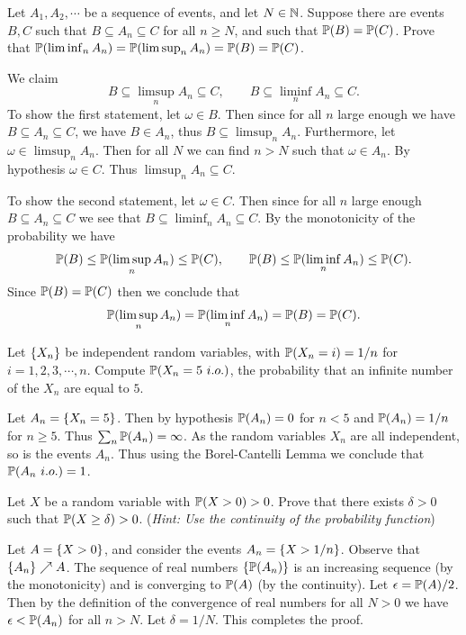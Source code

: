 \begin{problem}
	Let $ A_1,A_2,\cdots $ be a sequence of events, and let $ N \in \mathbb{N} $. Suppose there are events $ B,C $ such that $ B\subseteq A_n \subseteq C $ for all $ n\geq N $, and such that $ \mathbb{P}(B) = \mathbb{P}(C) $. Prove that $ \mathbb{P}(\liminf_n A_n) = \mathbb{P}(\limsup_n A_n) = \mathbb{P}(B) = \mathbb{P}(C) $.
\end{problem}
\begin{solution}
	We claim 
	\[ B \subseteq \limsup_n A_n \subseteq C, \qquad B \subseteq \liminf_n A_n \subseteq C. \]
	To show the first statement, let $ \omega \in B $. Then since for all $ n $ large enough we have $ B \subseteq A_n \subseteq C $, we have $ B \in A_n $, thus $ B \subseteq \limsup_n A_n $. Furthermore, let $ \omega \in \limsup_n A_n $. Then for all $ N $ we can find $ n>N $ such that $ \omega\in A_n $. By hypothesis $ \omega\in C $. Thus $ \limsup_n A_n \subseteq C $.
	
	\noindent To show the second statement, let $ \omega \in C $. Then since for all $ n $ large enough $ B \subseteq A_n \subseteq C $ we see that $ B\subseteq \liminf_n A_n \subseteq C $. By the monotonicity of the probability we have
	\[ \mathbb{P}(B) \leq \mathbb{P}(\limsup_n A_n) \leq \mathbb{P}(C) ,\qquad \mathbb{P}(B)\leq \mathbb{P}(\liminf_n A_n)\leq \mathbb{P}(C).\]
	Since $ \mathbb{P}(B) = \mathbb{P}(C) $ then we conclude that 
	\[ \mathbb{P}(\limsup_n A_n) = \mathbb{P}(\liminf_n A_n) = \mathbb{P}(B) = \mathbb{P}(C). \]
\end{solution}


\begin{problem}
	Let $ \{X_n\} $ be independent random variables, with $ \mathbb{P}(X_n = i) = 1/n $ for $ i=1,2,3,\cdots, n $. Compute $ \mathbb{P}(X_n = 5\ i.o.) $, the probability that an infinite number of the $ X_n $ are equal to $ 5 $.
\end{problem}
\begin{solution}
	Let $ A_n = \{X_n = 5\} $. Then by hypothesis $ \mathbb{P}(A_n) = 0 $ for $ n < 5 $ and $ \mathbb{P}(A_n) = 1/n $ for $ n \geq 5 $. Thus $ \sum_n \mathbb{P}(A_n) = \infty $. As the random variables $ X_n $ are all independent, so is the events $ A_n $. Thus using the Borel-Cantelli Lemma we conclude that $ \mathbb{P}(A_n\ i.o.) = 1 $.
\end{solution}


\begin{problem}
	Let $ X $ be a random variable with $ \mathbb{P}(X>0)>0 $. Prove that there exists $ \delta>0 $ such that $ \mathbb{P}(X \geq \delta) > 0 $. (\emph{Hint: Use the continuity of the probability function})
\end{problem}
\begin{solution}
	Let $ A = \{X>0\} $, and consider the events $ A_n = \{X > 1/n\} $. Observe that $ \{A_n\}\nearrow A $. The sequence of real numbers $ \{\mathbb{P}(A_n)\} $ is an increasing sequence (by the monotonicity) and is converging to $ \mathbb{P}(A) $ (by the continuity). Let $ \epsilon = \mathbb{P}(A)/2 $. Then by the definition of the convergence of real numbers for all $ N>0 $ we have $ \epsilon < \mathbb{P}(A_n) $ for all $ n>N $. Let $ \delta = 1/N $. This completes the proof.
\end{solution}


